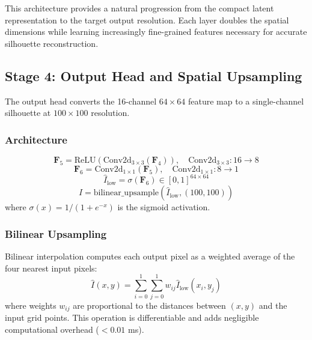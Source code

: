 \documentclass[12pt,a4paper,oneside]{report}
\begin{document}
This architecture provides a natural progression from the compact latent representation to the target output resolution. Each layer doubles the spatial dimensions while learning increasingly fine-grained features necessary for accurate silhouette reconstruction.

\subsection{Stage 4: Output Head and Spatial Upsampling}

The output head converts the 16-channel $64 \times 64$ feature map to a single-channel silhouette at $100 \times 100$ resolution.

\subsubsection{Architecture}

\begin{equation}
\mathbf{F}_5 = \text{ReLU}(\text{Conv2d}_{3\times3}(\mathbf{F}_4)), \quad \text{Conv2d}_{3\times3}: 16 \rightarrow 8
\end{equation}
\begin{equation}
\mathbf{F}_6 = \text{Conv2d}_{1\times1}(\mathbf{F}_5), \quad \text{Conv2d}_{1\times1}: 8 \rightarrow 1
\end{equation}
\begin{equation}
\hat{I}_{\text{low}} = \sigma(\mathbf{F}_6) \in [0, 1]^{64 \times 64}
\end{equation}
\begin{equation}
\hat{I} = \text{bilinear\_upsample}(\hat{I}_{\text{low}}, (100, 100))
\end{equation}
where $\sigma(x) = 1/(1 + e^{-x})$ is the sigmoid activation.

\subsubsection{Bilinear Upsampling}

Bilinear interpolation computes each output pixel as a weighted average of the four nearest input pixels:
\begin{equation}
\hat{I}(x,y) = \sum_{i=0}^{1}\sum_{j=0}^{1} w_{ij} \hat{I}_{\text{low}}(x_i, y_j)
\end{equation}
where weights $w_{ij}$ are proportional to the distances between $(x,y)$ and the input grid points. This operation is differentiable and adds negligible computational overhead ($<0.01$ ms).
\end{document}
